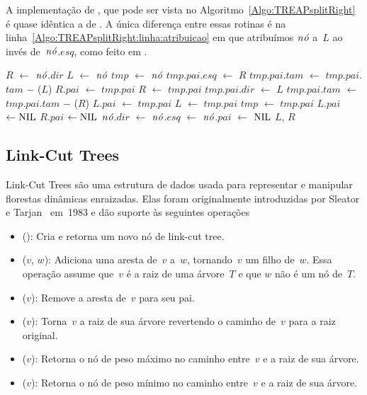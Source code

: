 A implementação de \treapSplitRight{}, que pode ser vista no Algoritmo~\ref{Algo:TREAPsplitRight} é quase idêntica a de \treapSplit{}.
A única diferença entre essas rotinas é na linha~\ref{Algo:TREAPsplitRight:linha:atribuicao} em que atribuímos $\node$ a~$L$ ao invés de~$\node$.$esq$, como feito em \treapSplit{}.

\begin{algorithm}
\caption{\treapSplitRight($\node$)}
\label{Algo:TREAPsplitRight}
\begin{algorithmic}[1]
\State $R$ $\gets $ $\node$.$dir$
\State $L$ $\gets $ $\node$ \label{Algo:TREAPsplitRight:linha:atribuicao}
\State $tmp$ $\gets$ $\node$
    \State $tmp$.$pai$.$esq$ $\gets$ $R$
    \State $tmp$.$pai$.$tam$ $\gets$ $tmp$.$pai$.$tam$ $\mathit{-}$ \treapGetSize($L$)
    \State $R$.$pai$ $\gets$ $tmp$.$pai$
    \EndIf
    \State $R$ $\gets$ $tmp$.$pai$
  \Else
    \State $tmp$.$pai$.$dir$ $\gets$ $L$ 
    \State $tmp$.$pai$.$tam$ $\gets$ $tmp$.$pai$.$tam$ $\mathit{-}$ \treapGetSize($R$)
    \State $L$.$pai$ $\gets$ $tmp$.$pai$
    \EndIf
    \State $L$ $\gets$ $tmp$.$pai$
  \EndIf
  \State $tmp$ $\gets$ $tmp$.$pai$
\EndWhile
{} $L$.$pai$ $\gets\text{NIL}$\EndIf
{} $R$.$pai$ $\gets\text{NIL}$\EndIf
\State $\node$.$dir$ $\gets $ $\node$.$esq$ $\gets$ $\node$.$pai$ $\gets$ $\text{NIL}$
\State\Return $L$, $R$
\end{algorithmic}
\end{algorithm}






\subsection{Link-Cut Trees}
\label{sec:linkcuttree}
Link-Cut Trees são uma estrutura de dados usada para representar e manipular florestas dinâmicas enraizadas.
Elas foram originalmente introduzidas por Sleator e Tarjan~\cite{SleatroTarjanLinkCutTree1983,} em~1983 e dão suporte às seguintes operações
\begin{itemize}
\item \linkcutCreate(): Cria e retorna um novo nó de link-cut tree.
\item \linkcutAddEdge($v$, $w$): Adiciona uma aresta de~$v$ a~$w$, tornando~$v$ um filho de~$w$. Essa operação assume que~$v$ é a raiz de uma árvore~$T$ e que $w$ não é um nó de~$T$.
\item \linkcutDelEdge($v$): Remove a aresta de~$v$ para seu pai.
\item \linkcutEvert($v$): Torna~$v$ a raiz de sua árvore revertendo o caminho de~$v$ para a raiz original.
\item \linkcutMax($v$): Retorna o nó de peso máximo no caminho entre~$v$ e a raiz de sua árvore.
\item \linkcutMin($v$): Retorna o nó de peso mínimo no caminho entre~$v$ e a raiz de sua árvore.
\end{itemize}


